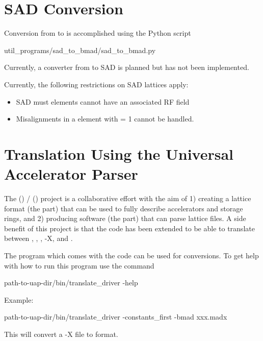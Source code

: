 \section{SAD Conversion}
\label{s:sad.convert}

Conversion from \cite{b:sad} to \bmad is accomplished using the Python script
\begin{example}
  util_programs/sad_to_bmad/sad_to_bmad.py
\end{example}
Currently, a converter from \bmad to SAD is planned but has not been implemented.

Currently, the following restrictions on SAD lattices apply:
  \begin{itemize}
  \item
SAD must elements cannot have an associated RF field
  \item
Misalignments in a  element with  = 1 cannot be handled.
  \end{itemize}

\section{Translation Using the Universal Accelerator Parser}
\label{s:aml}

The  () /  () project\cite{b:aml} is a collaborative
effort with the aim of 1) creating a lattice format (the 
part) that can be used to fully describe accelerators and storage
rings, and 2) producing software (the  part) that can parse
 lattice files. A side benefit of this project is that the
 code has been extended to be able to translate between
, \bmad, , \mad-X, and . 

The program
 which comes with the  code can be used
for conversions. To get help with how to run this program use the command
\begin{example}
  path-to-uap-dir/bin/translate_driver -help
\end{example}
Example:
\begin{example}
  path-to-uap-dir/bin/translate_driver -constants_first -bmad xxx.madx
\end{example}
This will convert a \mad-X file  to \bmad format.
